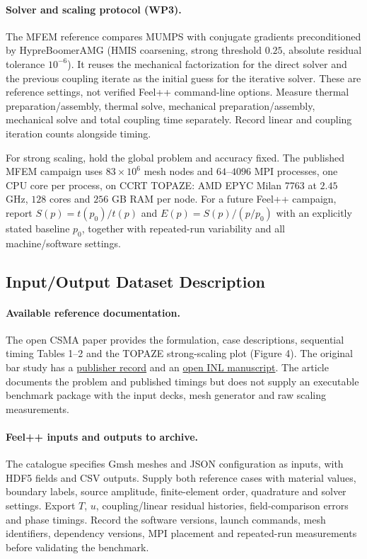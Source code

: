 \paragraph{Solver and scaling protocol (WP3).}
The MFEM reference compares MUMPS with conjugate gradients preconditioned by
HypreBoomerAMG (HMIS coarsening, strong threshold $0.25$, absolute residual
tolerance $10^{-6}$). It reuses the mechanical factorization for the direct
solver and the previous coupling iterate as the initial guess for the iterative
solver. These are reference settings, not verified Feel++ command-line options.
Measure thermal preparation/assembly, thermal solve, mechanical
preparation/assembly, mechanical solve and total coupling time separately.
Record linear and coupling iteration counts alongside timing.

For strong scaling, hold the global problem and accuracy fixed. The published
MFEM campaign uses $83\times10^6$ mesh nodes and $64$--$4096$ MPI processes,
one CPU core per process, on CCRT TOPAZE: AMD EPYC Milan 7763 at $2.45$ GHz,
$128$ cores and $256$ GB RAM per node. For a future Feel++ campaign,
report $S(p)=t(p_0)/t(p)$ and
$E(p)=S(p)/(p/p_0)$ with an explicitly stated baseline $p_0$, together with
repeated-run variability and all machine/software settings.

\subsection{Input/Output Dataset Description}
\paragraph{Available reference documentation.}
The open CSMA paper provides the formulation, case descriptions, sequential
timing Tables 1--2 and the TOPAZE strong-scaling plot (Figure 4).
The original bar study has a
\href{https://doi.org/10.1016/j.nucengdes.2015.07.005}{publisher record} and an
\href{https://www.osti.gov/servlets/purl/1248174}{open INL manuscript}.
The article documents the problem and published timings but does not supply
an executable benchmark package with the input decks, mesh generator and
raw scaling measurements.

\paragraph{Feel++ inputs and outputs to archive.}
The catalogue specifies Gmsh meshes and JSON configuration as inputs, with HDF5
fields and CSV outputs. Supply both reference cases with material values,
boundary labels, source amplitude, finite-element order, quadrature and solver
settings. Export $T$, $u$, coupling/linear residual histories, field-comparison
errors and phase timings. Record the software versions, launch commands,
mesh identifiers, dependency versions, MPI placement and repeated-run
measurements before validating the benchmark.

